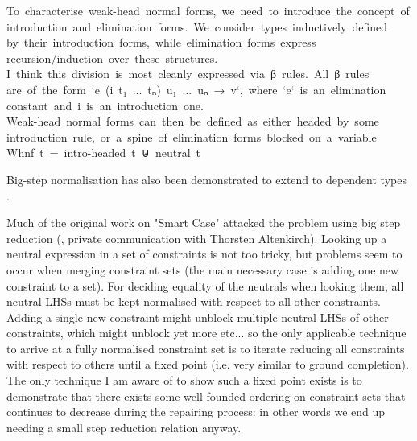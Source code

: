 \documentclass[
    a4paper, %
    fontsize=9.5pt, %
    twoside=false, %
	numbers=noenddot, %
	fontmethod=tex, %
]{kaobook}
\def\resethooks{%
  \global\let\SaveRestoreHook\empty
  \global\let\ColumnHook\empty}
\newlength{\blanklineskip}
\let\hspre\empty
\let\hspost\empty
\begin{document}
\begin{hscode}\SaveRestoreHook
\column{B}{@{}>{\hspre}l<{\hspost}@{}}%
\column{E}{@{}>{\hspre}l<{\hspost}@{}}%
\>[B]{}\mbox{\onelinecomment  To characterise weak-head normal forms, we need to introduce the concept of}{}\<[E]%
\\
\>[B]{}\mbox{\onelinecomment  introduction and elimination forms. We consider types inductively defined}{}\<[E]%
\\
\>[B]{}\mbox{\onelinecomment  by their introduction forms, while elimination forms express }{}\<[E]%
\\
\>[B]{}\mbox{\onelinecomment  recursion/induction over these structures.}{}\<[E]%
\\
\>[B]{}\mbox{\onelinecomment  I think this division is most cleanly expressed via β rules. All β rules}{}\<[E]%
\\
\>[B]{}\mbox{\onelinecomment  are of the form `e (i t₁ ... tₙ) u₁ ... uₙ → v`, where `e` is an elimination}{}\<[E]%
\\
\>[B]{}\mbox{\onelinecomment  constant and i is an introduction one.}{}\<[E]%
\\[\blanklineskip]%
\>[B]{}\mbox{\onelinecomment  Weak-head normal forms can then be defined as either headed by some}{}\<[E]%
\\
\>[B]{}\mbox{\onelinecomment  introduction rule, or a spine of elimination forms blocked on a variable}{}\<[E]%
\\
\>[B]{}\mbox{\onelinecomment  Whnf t = intro-headed t ⊎ neutral t}{}\<[E]%
\ColumnHook
\end{hscode}\resethooks


Big-step normalisation has also been demonstrated to extend to
dependent types .


Much of the original work on "Smart Case" attacked the problem using big step
reduction (, private 
communication with Thorsten Altenkirch). Looking up a neutral expression
in a set of constraints is not too tricky, but problems seem to occur when
merging constraint sets (the main necessary case is adding one new constraint
to a set). For deciding equality of the neutrals when looking them, all neutral
LHSs must be kept normalised with respect to all other constraints. Adding a
single new constraint might unblock multiple neutral LHSs of other constraints,
which might unblock yet more etc... so the only applicable technique to arrive
at a fully normalised constraint set is to iterate reducing all constraints
with respect to others until a fixed point (i.e. very similar to ground 
completion). The only technique I am aware of to show such a fixed point exists
is to demonstrate that there exists some well-founded ordering on constraint
sets that continues to decrease during the repairing process: in other words
we end up needing a small step reduction relation anyway.
\end{document}
